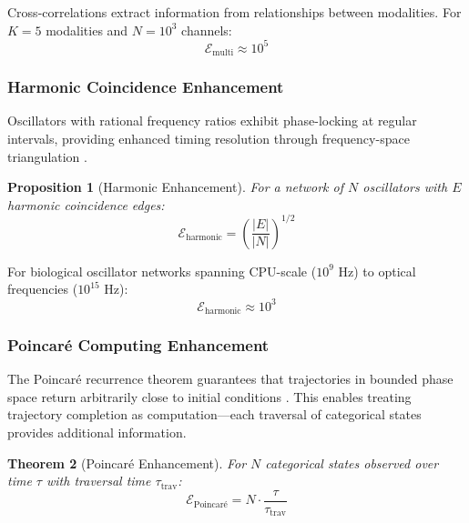 \documentclass[twocolumn,10pt]{article}
\newtheorem{theorem}{Theorem}[section]
\newtheorem{proposition}[theorem]{Proposition}
\begin{document}
Cross-correlations extract information from relationships between modalities. For $K = 5$ modalities and $N = 10^3$ channels:
\begin{equation}
    \mathcal{E}_{\text{multi}} \approx 10^{5}
\end{equation}

\subsubsection{Harmonic Coincidence Enhancement}

Oscillators with rational frequency ratios exhibit phase-locking at regular intervals, providing enhanced timing resolution through frequency-space triangulation \cite{pikovsky2001}.

\begin{proposition}[Harmonic Enhancement]
\label{prop:harmonic}
For a network of $N$ oscillators with $E$ harmonic coincidence edges:
\begin{equation}
    \mathcal{E}_{\text{harmonic}} = \left(\frac{|E|}{|N|}\right)^{1/2}
\end{equation}
\end{proposition}

For biological oscillator networks spanning CPU-scale ($10^9$ Hz) to optical frequencies ($10^{15}$ Hz):
\begin{equation}
    \mathcal{E}_{\text{harmonic}} \approx 10^{3}
\end{equation}

\subsubsection{Poincar\'{e} Computing Enhancement}

The Poincar\'{e} recurrence theorem guarantees that trajectories in bounded phase space return arbitrarily close to initial conditions \cite{poincare1890}. This enables treating trajectory completion as computation---each traversal of categorical states provides additional information.

\begin{theorem}[Poincar\'{e} Enhancement]
\label{thm:poincare}
For $N$ categorical states observed over time $\tau$ with traversal time $\tau_{\text{trav}}$:
\begin{equation}
    \mathcal{E}_{\text{Poincar\'{e}}} = N \cdot \frac{\tau}{\tau_{\text{trav}}}
\end{equation}
\end{theorem}
\end{document}

